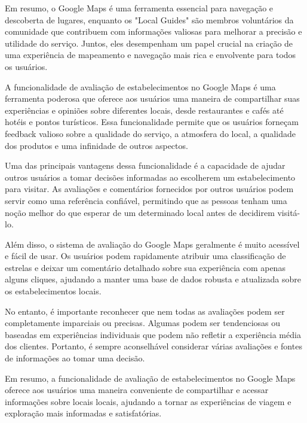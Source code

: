 Em resumo, o Google Maps é uma ferramenta essencial para navegação e descoberta de lugares, enquanto os "Local Guides" são membros voluntários da comunidade que contribuem com informações valiosas para melhorar a precisão e utilidade do serviço. Juntos, eles desempenham um papel crucial na criação de uma experiência de mapeamento e navegação mais rica e envolvente para todos os usuários.



A funcionalidade de avaliação de estabelecimentos no Google Maps é uma ferramenta poderosa que oferece aos usuários uma maneira de compartilhar suas experiências e opiniões sobre diferentes locais, desde restaurantes e cafés até hotéis e pontos turísticos. Essa funcionalidade permite que os usuários forneçam feedback valioso sobre a qualidade do serviço, a atmosfera do local, a qualidade dos produtos e uma infinidade de outros aspectos.

Uma das principais vantagens dessa funcionalidade é a capacidade de ajudar outros usuários a tomar decisões informadas ao escolherem um estabelecimento para visitar. As avaliações e comentários fornecidos por outros usuários podem servir como uma referência confiável, permitindo que as pessoas tenham uma noção melhor do que esperar de um determinado local antes de decidirem visitá-lo.

Além disso, o sistema de avaliação do Google Maps geralmente é muito acessível e fácil de usar. Os usuários podem rapidamente atribuir uma classificação de estrelas e deixar um comentário detalhado sobre sua experiência com apenas alguns cliques, ajudando a manter uma base de dados robusta e atualizada sobre os estabelecimentos locais.

No entanto, é importante reconhecer que nem todas as avaliações podem ser completamente imparciais ou precisas. Algumas podem ser tendenciosas ou baseadas em experiências individuais que podem não refletir a experiência média dos clientes. Portanto, é sempre aconselhável considerar várias avaliações e fontes de informações ao tomar uma decisão.

Em resumo, a funcionalidade de avaliação de estabelecimentos no Google Maps oferece aos usuários uma maneira conveniente de compartilhar e acessar informações sobre locais locais, ajudando a tornar as experiências de viagem e exploração mais informadas e satisfatórias.

